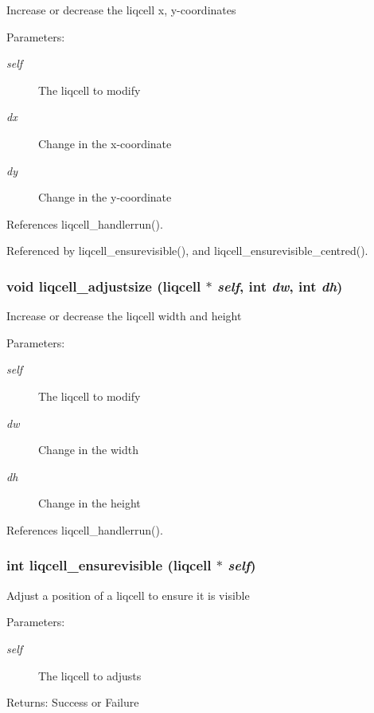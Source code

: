 Increase or decrease the liqcell x, y-coordinates \begin{Desc}
\item[Parameters:]
\begin{description}
\item[{\em self}]The liqcell to modify \item[{\em dx}]Change in the x-coordinate \item[{\em dy}]Change in the y-coordinate \end{description}
\end{Desc}


References liqcell\_\-handlerrun().

Referenced by liqcell\_\-ensurevisible(), and liqcell\_\-ensurevisible\_\-centred().
\subsubsection[{liqcell\_\-adjustsize}]{\setlength{\rightskip}{0pt plus 5cm}void liqcell\_\-adjustsize (liqcell $\ast$ {\em self}, \/  int {\em dw}, \/  int {\em dh})}\label{d5/da2/liqcell_8c_0e367312d5759c2e2f44bd7490d3a350}


Increase or decrease the liqcell width and height \begin{Desc}
\item[Parameters:]
\begin{description}
\item[{\em self}]The liqcell to modify \item[{\em dw}]Change in the width \item[{\em dh}]Change in the height \end{description}
\end{Desc}


References liqcell\_\-handlerrun().
\subsubsection[{liqcell\_\-ensurevisible}]{\setlength{\rightskip}{0pt plus 5cm}int liqcell\_\-ensurevisible (liqcell $\ast$ {\em self})}\label{d5/da2/liqcell_8c_a954a0f6aca1cc1e16f37d0dd2afcce5}


Adjust a position of a liqcell to ensure it is visible \begin{Desc}
\item[Parameters:]
\begin{description}
\item[{\em self}]The liqcell to adjusts \end{description}
\end{Desc}
\begin{Desc}
\item[Returns:]Success or Failure \end{Desc}


